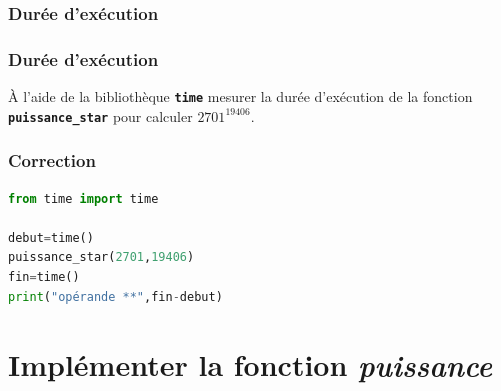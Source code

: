 \documentclass[svgnames,11pt]{beamer}
\begin{document}
\subsubsection{Durée d'exécution}
\begin{frame}
    \frametitle{Durée d'exécution}

\begin{activite}
À l'aide de la bibliothèque \textbf{\texttt{time}} mesurer la durée d'exécution de la fonction \textbf{\texttt{puissance\_star}} pour calculer $2701^19406$.
\end{activite}

\end{frame}
\begin{frame}[fragile]
    \frametitle{Correction}

\begin{center}
\begin{lstlisting}[language=Python , basicstyle=\ttfamily\small, xleftmargin=2em, xrightmargin=2em]
from time import time

debut=time()
puissance_star(2701,19406)
fin=time()
print("opérande **",fin-debut)
\end{lstlisting}
\label{CODE}
\end{center}

\end{frame}
\section{Implémenter la fonction \emph{puissance}}
\end{document}

